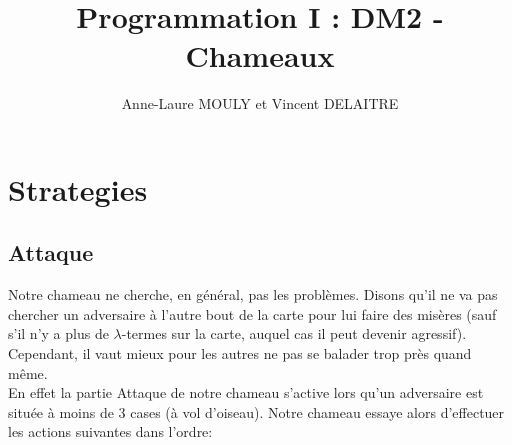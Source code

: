 \documentclass[a4paper,12pt]{article}
\title{Programmation I : DM2 - Chameaux}
\author{Anne-Laure MOULY et Vincent DELAITRE}
\begin{document}
\maketitle
\section{Strategies}
\subsection{Attaque}
Notre chameau ne cherche, en g\'en\'eral, pas les probl\`emes. Disons qu'il ne va pas chercher un adversaire \`a l'autre bout de la carte pour lui faire des mis\`eres (sauf s'il n'y a plus de $\lambda$-termes sur la carte, auquel cas il peut devenir agressif). Cependant, il vaut mieux pour les autres ne pas se balader trop pr\`es quand m\^eme.\\
En effet la partie Attaque de notre chameau s'active lors qu'un adversaire est situ\'ee \`a moins de 3 cases (\`a vol d'oiseau). Notre chameau essaye alors d'effectuer les actions suivantes dans l'ordre:
\end{document}

